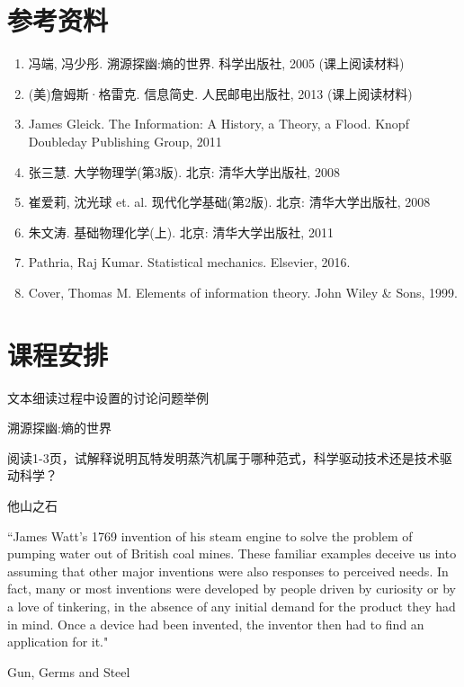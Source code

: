 \documentclass[12pt]{ctexart}
\begin{document}
\section{参考资料}
\begin{enumerate}
\item 冯端, 冯少彤. 溯源探幽:熵的世界. 科学出版社, 2005 (课上阅读材料)
\item (美)詹姆斯·格雷克. 信息简史. 人民邮电出版社, 2013 (课上阅读材料)
\item James Gleick. The Information: A History, a Theory, a Flood. Knopf Doubleday Publishing Group, 2011
\item 张三慧. 大学物理学(第3版).  北京: 清华大学出版社, 2008
\item 崔爱莉, 沈光球 et. al. 现代化学基础(第2版). 北京: 清华大学出版社, 2008
\item 朱文涛. 基础物理化学(上). 北京: 清华大学出版社, 2011
\item Pathria, Raj Kumar. Statistical mechanics. Elsevier, 2016.
\item Cover, Thomas M. Elements of information theory. John Wiley \& Sons, 1999.
\end{enumerate}

\section{课程安排}



文本细读过程中设置的讨论问题举例


溯源探幽:熵的世界

阅读1-3页，试解释说明瓦特发明蒸汽机属于哪种范式，科学驱动技术还是技术驱动科学？

他山之石

``James Watt’s 1769 invention of his steam engine to solve the problem of pumping water out of British coal mines.
These familiar examples deceive us into assuming that other major inventions were also responses to perceived needs. In fact, many or most inventions were developed by people driven by curiosity or by a love of tinkering, in the absence of any initial demand for the product they had in mind. Once a device had been invented, the inventor then had to find an application for it."


Gun, Germs and Steel
\end{document}
